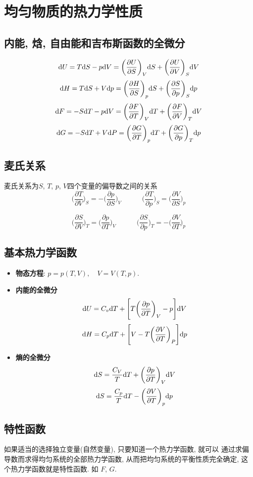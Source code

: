 \section{均匀物质的热力学性质}

\subsection{内能, 焓, 自由能和吉布斯函数的全微分}
\[
\mathrm{d} U = T\mathrm{d} S - p\mathrm{d} V = \bigg(\frac{\partial U}{\partial S}\bigg)_V\mathrm{d} S + \bigg(\frac{\partial U}{\partial V}\bigg)_S\mathrm{d} V
\]
\[
\mathrm{d} H = T\mathrm{d} S + V\mathrm{d} p = \bigg(\frac{\partial H}{\partial S}\bigg)_p\mathrm{d} S + \bigg(\frac{\partial S}{\partial p}\bigg)_S\mathrm{d} p
\]
\[
\mathrm{d} F = -S\mathrm{d} T - p\mathrm{d} V = \bigg(\frac{\partial F}{\partial T}\bigg)_V\mathrm{d} T + \bigg(\frac{\partial F}{\partial V}\bigg)_T\mathrm{d} V
\]
\[
\mathrm{d} G = -S\mathrm{d} T + V\mathrm{d} P = \bigg(\frac{\partial G}{\partial T}\bigg)_p\mathrm{d} T + \bigg(\frac{\partial G}{\partial p}\bigg)_T\mathrm{d} p
\]

\subsection{麦氏关系}
麦氏关系为$S$, $T$, $p$, $V$四个变量的偏导数之间的关系
\[
\Big(\frac{\partial T}{\partial V}\Big)_S=-\Big(\frac{\partial p
}{\partial S}\Big)_V  \quad\qquad \Big(\frac{\partial T}{\partial
p}\Big)_S=\Big(\frac{\partial V }{\partial S}\Big)_p
\]

\[
\Big(\frac{\partial S}{\partial V}\Big)_T=\Big(\frac{\partial p
}{\partial T}\Big)_V  \quad\qquad \Big(\frac{\partial S}{\partial
p}\Big)_T=-\Big(\frac{\partial V }{\partial T}\Big)_p
\]


\subsection{基本热力学函数}
\begin{itemize}
\item \textbf{物态方程}: $\displaystyle p = p(T,V),\quad V = V(T,p)$.
\item \textbf{内能的全微分}
\[
\mathrm{d} U = C_v \mathrm{d} T + \Bigg[ T\bigg(\frac{\partial p}{\partial T}\bigg)_V - p\Bigg]\mathrm{d} V
\]
\[
\mathrm{d} H = C_p \mathrm{d} T + \Bigg[V - T\bigg(\frac{\partial V}{\partial T}\bigg)_P \Bigg]\mathrm{d} p
\]
\item \textbf{熵的全微分}
\[
\mathrm{d} S = \frac{C_V}{T} \mathrm{d} T + \bigg(\frac{\partial p}{\partial T}\bigg)_V \mathrm{d} V 
\]
\[
\mathrm{d} S = \frac{C_p}{T} \mathrm{d} T - \bigg(\frac{\partial V}{\partial T}\bigg)_p \mathrm{d} p
\]
\end{itemize}

\subsection{特性函数}
如果适当的选择独立变量(自然变量), 只要知道一个热力学函数, 就可以
通过求偏导数而求得均匀系统的全部热力学函数, 从而把均匀系统的平衡性质完全确定,
这个热力学函数就是特性函数. 如 $F$, $G$.
